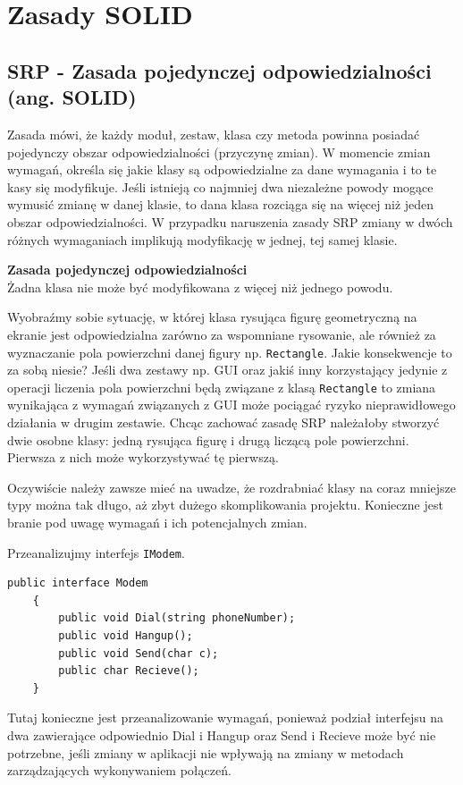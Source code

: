 \section{Zasady SOLID}

\subsection{SRP - Zasada pojedynczej odpowiedzialności (ang. \textbf{S}OLID)}

Zasada mówi, że każdy moduł, zestaw, klasa czy metoda powinna posiadać pojedynczy obszar odpowiedzialności (przyczynę zmian).  W momencie zmian wymagań, określa się jakie klasy są odpowiedzialne za dane wymagania i to te kasy się modyfikuje. Jeśli istnieją co najmniej dwa niezależne powody mogące wymusić zmianę w danej klasie, to dana klasa rozciąga się na więcej niż jeden obszar odpowiedzialności. W przypadku naruszenia zasady SRP zmiany w dwóch różnych wymaganiach implikują modyfikację w jednej, tej samej klasie. 

\begin{tcolorbox}[colback=yellow]	
	\textbf{Zasada pojedynczej odpowiedzialności}\\
	Żadna klasa nie może być modyfikowana z więcej niż jednego powodu.
\end{tcolorbox}


Wyobraźmy sobie sytuację, w której klasa rysująca figurę geometryczną na ekranie jest odpowiedzialna zarówno za wspomniane rysowanie, ale również za wyznaczanie pola powierzchni danej figury np. \texttt{Rectangle}. Jakie konsekwencje to za sobą niesie? Jeśli dwa zestawy np. GUI oraz jakiś inny korzystający jedynie z operacji liczenia pola powierzchni będą związane z klasą \texttt{Rectangle} to zmiana wynikająca z wymagań związanych z GUI może pociągać ryzyko nieprawidłowego działania w drugim zestawie. Chcąc zachować zasadę SRP należałoby stworzyć dwie osobne klasy: jedną rysująca figurę i drugą liczącą pole powierzchni. Pierwsza z nich może wykorzystywać tę pierwszą. 

Oczywiście należy zawsze mieć na uwadze, że rozdrabniać klasy na coraz mniejsze typy można tak długo, aż zbyt dużego skomplikowania projektu. Konieczne jest branie pod uwagę wymagań i ich potencjalnych zmian.

Przeanalizujmy interfejs \texttt{IModem}.
\begin{lstlisting}[caption={Naruszenie zasady SRP}, label={lab1/lst/srpViolationModem}]
	public interface Modem
	{
		public void Dial(string phoneNumber);
		public void Hangup();
		public void Send(char c);
		public char Recieve();
	}
\end{lstlisting}
Tutaj konieczne jest przeanalizowanie wymagań, ponieważ podział interfejsu na dwa zawierające odpowiednio Dial i Hangup oraz Send i Recieve może być nie potrzebne, jeśli zmiany w aplikacji nie wpływają na zmiany w metodach zarządzających wykonywaniem połączeń.

